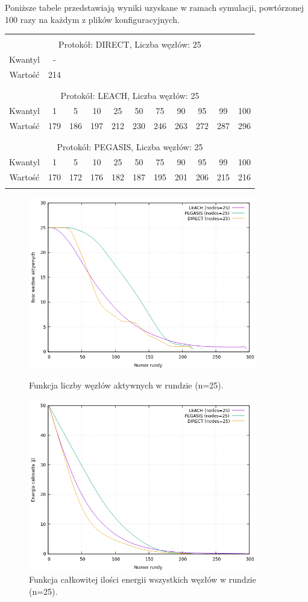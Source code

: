 \documentclass[a4paper,12pt,twoside,openany]{report}
\begin{document}
Poniższe tabele przedstawiają wyniki uzyskane w ramach symulacji, powtórzonej 100 razy na każdym z plików konfiguracyjnych.

\begin{longtable}{*{11}{c}}
\toprule \\*
\multicolumn{11}{c}{Protokół: DIRECT, Liczba węzłów: 25} \\*
Kwantyl	& -	\\*
Wartość	& 214	\\*
\midrule \\*
\\*
\multicolumn{11}{c}{Protokół: LEACH, Liczba węzłów: 25} \\*
Kwantyl	& 1	& 5	& 10	& 25	& 50	& 75	& 90	& 95	& 99	& 100	\\*
Wartość	& 179	& 186	& 197	& 212	& 230	& 246	& 263	& 272	& 287	& 296	\\*
\midrule \\*
\\*
\multicolumn{11}{c}{Protokół: PEGASIS, Liczba węzłów: 25} \\*
Kwantyl	& 1	& 5	& 10	& 25	& 50	& 75	& 90	& 95	& 99	& 100	\\*
Wartość	& 170	& 172	& 176	& 182	& 187	& 195	& 201	& 206	& 215	& 216	\\*
\bottomrule \\*
\end{longtable}

\begin{figure}[H]
 \centering
 \includegraphics[width=10cm]{images/gnuplot/test_2/nodes_in_round_25.png}
 \caption{Funkcja liczby węzłów aktywnych w rundzie (n=25).}
 \includegraphics[width=10cm]{images/gnuplot/test_2/energy_in_round_25.png}
 \caption{Funkcja całkowitej ilości energii wszystkich węzłów w rundzie (n=25).}
\end{figure}
\end{document}

